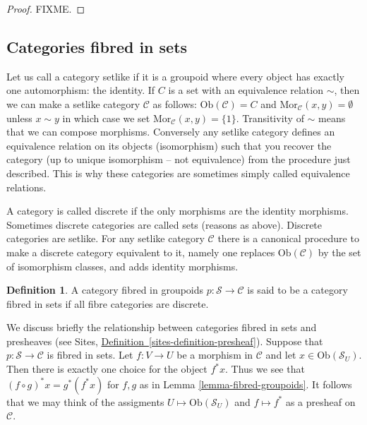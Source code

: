 \documentclass{amsart}
\theoremstyle{definition}
\newtheorem{definition}[theorem]{Definition}
\theoremstyle{remark}
\numberwithin{equation}{subsection}
\begin{document}
\begin{proof} 
FIXME.
\end{proof}

\subsection{Categories fibred in sets}
\label{subsection-fibred-in-sets}

\noindent
Let us call a category setlike if it is a groupoid where every object
has exactly one automorphism: the identity. If $C$ is a set with an 
equivalence relation $\sim$, then we can make a setlike category
$\mathcal{C}$ as follows: $\text{Ob}(\mathcal{C}) = C$ and 
$\text{Mor}_\mathcal{C}(x,y) = \emptyset$ unless $x \sim y$ in which
case we set $\text{Mor}_\mathcal{C}(x,y) = \{1\}$. Transitivity of
$\sim$ means that we can compose morphisms. Conversely any setlike
category defines an equivalence relation on its objects (isomorphism)
such that you recover the category (up to unique isomorphism -- not
equivalence) from the procedure just described. This is why these categories
are sometimes simply called equivalence relations.

\smallskip\noindent
A category is called discrete if the only morphisms are the identity 
morphisms. Sometimes discrete categories are called sets (reasons as above).
Discrete categories are setlike. For any setlike category $\mathcal{C}$
there is a canonical procedure to make a discrete category equivalent to it,
namely one replaces $\text{Ob}(\mathcal{C})$ by the set of isomorphism
classes, and adds identity morphisms.

\begin{definition}
\label{definition-category-fibred-sets}
A category fibred in groupoids $p : \mathcal{S} \to \mathcal{C}$ is said
to be a category fibred in sets if all fibre categories are discrete.
\end{definition}

\noindent
We discuss briefly the relationship between categories fibred in sets
and presheaves (see Sites, \hyperref[sites-definition-presheaf]%
{Definition~\ref*{sites-definition-presheaf}}). Suppose that $p :
\mathcal{S} \to \mathcal{C}$ is fibred in sets. Let $f : V \to U$
be a morphism in $\mathcal{C}$ and let $x \in \text{Ob}(\mathcal{S}_U)$.
Then there is exactly one choice for the object $f^\ast x$. Thus we see that
$(f \circ g)^\ast x = g^\ast(f^\ast x)$ for $f,g$ as in Lemma
\ref{lemma-fibred-groupoids}. It follows that we may think of the
assigments $U \mapsto \text{Ob}(\mathcal{S}_U)$ and $f \mapsto f^\ast$
as a presheaf on $\mathcal{C}$.
\end{document}
